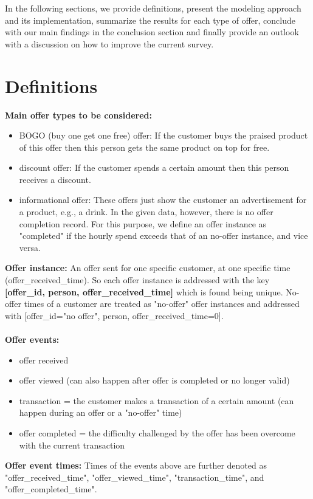 \documentclass[11pt]{article} %
\begin{document}
In the following sections, we provide definitions, present the modeling approach and its implementation, summarize the results for each type of offer, conclude with our main findings in the conclusion section and finally provide an outlook with a discussion on how to improve the current survey.


\section{Definitions}
\textbf{Main offer types to be considered:}
\begin{itemize}
\item BOGO (buy one get one free) offer: If the customer buys the praised product of this offer then this person gets the same product on top for free.
\item discount offer: If the customer spends a certain amount then this person receives a discount.
\item informational offer: These offers just show the customer an advertisement for a product, e.g., a drink. In the given data, however, there is no offer completion record.
For this purpose, we define an offer instance as "completed" if the hourly spend exceeds that of an no-offer instance, and vice versa.
\end{itemize}
\noindent\textbf{Offer instance:} 
An offer sent for one specific customer, at one specific time (offer\_received\_time). So each offer instance is addressed with the key \textbf{[offer\_id, person, offer\_received\_time]} which is found being unique.
No-offer times of a customer are treated as "no-offer" offer instances and addressed with [offer\_id="no offer", person, offer\_received\_time=0].
\\
\\
\noindent\textbf{Offer events:} 
\begin{itemize}
\item offer received
\item offer viewed (can also happen after offer is completed or no longer valid)
\item transaction = the customer makes a transaction of a certain amount (can happen during an offer or a "no-offer" time)
\item offer completed = the difficulty challenged by the offer has been overcome with the current transaction
\end{itemize}
\noindent\textbf{Offer event times:} 
Times of the  events above are further denoted as "offer\_received\_time", "offer\_viewed\_time", "transaction\_time", and "offer\_completed\_time".
\end{document}
